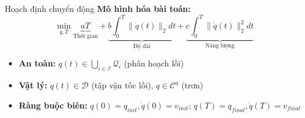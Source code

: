 \documentclass[aspectratio=169]{beamer}
\begin{document}
\begin{frame}{Hoạch định chuyển động}
    \textbf{Mô hình hóa bài toán:}
    \begin{equation*}
        \min_{q, T} \underbrace{aT}_{\text{Thời gian}} + \underbrace{b \int_{0}^{T} \|\dot{q}(t)\|_2 dt}_{\text{Độ dài}} + \underbrace{c \int_{0}^{T} \|\dot{q}(t)\|_2^2 dt}_{\text{Năng lượng}}
    \end{equation*}
    \begin{itemize}
        \item \textbf{An toàn:} $q(t) \in \bigcup_{i \in \mathcal{I}} \mathcal{Q}_i$ (phân hoạch lồi)
        \item \textbf{Vật lý:} $\dot{q}(t) \in \mathcal{D}$ (tập vận tốc lồi), $q \in \mathcal{C}^\eta$ (trơn)
        \item \textbf{Ràng buộc biên:} $q(0) = q_{init}, \dot{q}(0) = v_{init}$; $q(T) = q_{final}, \dot{q}(T) = v_{final}$
    \end{itemize}

\end{frame}
\end{document}

